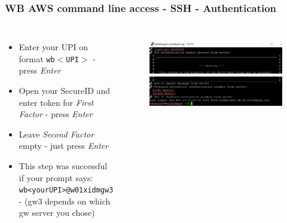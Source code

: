 \documentclass[aspectratio=169]{beamer} %
\begin{document}
\begin{frame}
	\frametitle{WB AWS command line access - SSH - Authentication}
	\begin{columns}[c]
		\begin{itemize}
			\item Enter your UPI on format \texttt{wb$<$UPI$>$} - press \textit{Enter}
			\item Open your SecureID and enter token for \textit{First Factor} - press \textit{Enter}
			\item Leave \textit{Second Factor} empty - just press \textit{Enter}
			\item This step was successful if your prompt says:
			\texttt{wb<yourUPI>@w01xidmgw3}
			- (gw3 depends on which gw server you chose)
		\end{itemize}

		\begin{figure}
			\centering
			\includegraphics[width=\textwidth]{./img/access-2a.png}
			\includegraphics[width=\textwidth]{./img/access-2b.png}
		\end{figure}

	\end{columns}
\end{frame}
\end{document}

